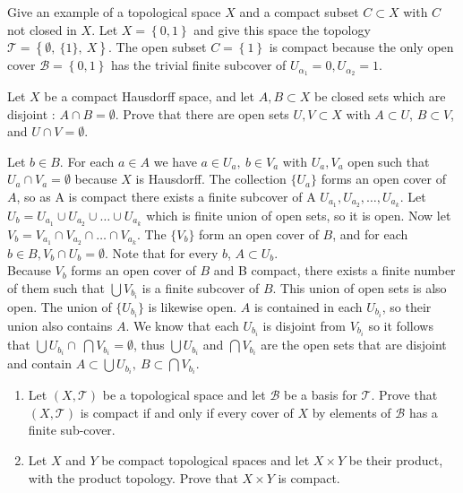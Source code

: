 \documentclass{jhwhw}
\newcommand{\T}{{\mathcal T}}
\newcommand{\B}{{\mathcal B}}
\begin{document}
\problem{} %
Give an example of a topological space $X$ and a compact subset $C\subset X$ with $C$ not closed in $X$.
\solution{}
Let $X=\left\{ 0,1\right\}$ and give this space the topology $\T=\left\{ \emptyset,\  \{1\},\ X\right\}$. The open subset $C=\left\{ 1\right\}$ is compact because the only open cover $\B =\left\{0,1\right\}$ has the trivial finite subcover of $U_{\alpha_1}=0, U_{\alpha_2}=1$. 


\problem{}%
Let $X$ be a compact Hausdorff space, and let $A,B\subset X$ be closed sets which are  disjoint : $A\cap B =\emptyset$.  Prove that there are open sets $U,V\subset X$ with $A\subset U$, $B\subset V$, and $U\cap V = \emptyset$. 

\solution{}
Let $b \in B$. For each $a \in A$ we have $a \in U_a ,\ b \in V_a $ with $U_a, V_a$ open such that $U_a \cap V_a = \emptyset$ because $X$ is Hausdorff. The collection $\{U_a\}$ forms an open cover of $A$, so as A is compact there exists a finite subcover of A $U_{a_1}, U_{a_2}, \ldots, U_{a_k}$. Let $U_b = U_{a_1} \cup U_{a_2} \cup \dots \cup U_{a_k}$ which is finite union of open sets, so it is open. Now let $V_b = V_{a_1} \cap V_{a_2} \cap \dots \cap V_{a_k}$. The $\{V_b\}$ form an open cover of $B$, and for each $b \in B, V_b \cap U_b = \emptyset$.  Note that for every $b$, $A \subset U_b$. 
\\

Because $V_b$ forms an open cover of $B$ and B compact, there exists a finite number of them such that $ \bigcup V_{b_i}$ is a finite subcover of $B$. This union of open sets is also open. The union of $\{U_{b_i}\}$ is likewise open. $A$ is contained in each $U_{b_i}$, so their union also contains $A$. We know that each $U_{b_i}$ is disjoint from $V_{b_i}$ so it follows that $\bigcup U_{b_i} \cap\  \bigcap V_{b_i}  = \emptyset$, thus $\bigcup U_{b_i}$ and $\bigcap V_{b_i}$ are the open sets that are disjoint and contain $A\subset\bigcup U_{b_i} ,\ B\subset\bigcap V_{b_i} $.  



\problem{}%
\begin{enumerate}
	\item Let $(X,\T)$ be a topological space and let $\B$ be a basis for $\T$.  Prove that $(X,\T)$ is compact if and only if every cover of $X$ by elements of $\B$ has a finite sub-cover. 
	\item Let $X$ and $Y$ be compact topological spaces and let $X\times Y$ be their product, with the product topology.   Prove that $X\times Y$ is compact.
	
\end{enumerate}
\solution{}
\end{document}
